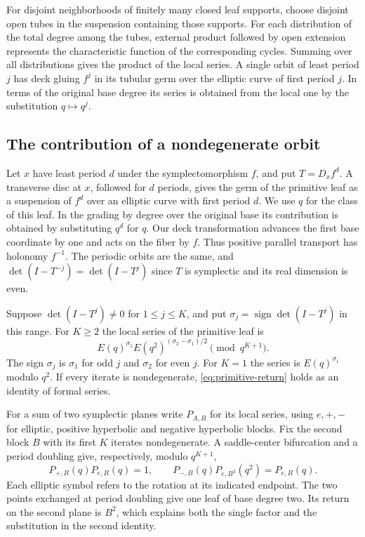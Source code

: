 For disjoint neighborhoods of finitely many closed leaf supports, choose
disjoint open tubes in the suspension containing those supports.
For each distribution of the total degree among the tubes, external
product followed by open extension represents the characteristic function
of the corresponding cycles. Summing over all distributions gives the
product of the local series. A single orbit of least period $j$ has
deck gluing $f^j$ in its tubular germ over the elliptic curve of first
period $j$. In terms of the original base degree its series is obtained
from the local one by the substitution $q\mapsto q^j$.

\subsection{The contribution of a nondegenerate orbit}\label{sec:returns}

Let $x$ have least period $d$ under the symplectomorphism $f$, and put
$T=D_xf^d$. A transverse disc at $x$, followed for $d$ periods,
gives the germ of the primitive leaf as a suspension of $f^d$ over an
elliptic curve with first period $d$. We use $q$ for the class of this
leaf. In the grading by degree over the original base its contribution
is obtained by substituting $q^d$ for $q$. Our deck transformation
advances the first base coordinate by one and acts on the fiber by
$f$. Thus positive parallel transport has holonomy $f^{-1}$.
The periodic orbits are the same, and
$\det(I-T^{-j})=\det(I-T^j)$ since $T$ is symplectic and its real
dimension is even.

\begin{proposition}\label{prop:return}
Suppose $\det(I-T^j)\ne0$ for $1\le j\le K$, and put
$\sigma_j=\operatorname{sign}\det(I-T^j)$ in this range. For $K\ge2$
the local series of the primitive leaf is
\begin{equation}\label{eq:primitive-return}
 E(q)^{\sigma_1} E(q^2)^{(\sigma_2-\sigma_1)/2}
 \pmod {q^{K+1}} .
\end{equation}
The sign $\sigma_j$ is $\sigma_1$ for odd $j$ and $\sigma_2$ for
even $j$. For $K=1$ the series is $E(q)^{\sigma_1}$ modulo $q^2$.
If every iterate is nondegenerate, \eqref{eq:primitive-return} holds
as an identity of formal series.
\end{proposition}

For a sum of two symplectic planes write $P_{A,B}$ for its local
series, using $e,+,-$ for elliptic, positive hyperbolic and negative
hyperbolic blocks. Fix the second block $B$ with its first $K$ iterates
nondegenerate. A saddle-center bifurcation and a period doubling give,
respectively, modulo $q^{K+1}$,
\begin{equation}\label{eq:return-walls}
 P_{+,B}(q)P_{e,B}(q)=1,\qquad
 P_{-,B}(q)P_{e,B^2}(q^2)=P_{e,B}(q).
\end{equation}
Each elliptic symbol refers to the rotation at its indicated endpoint.
The two points exchanged at period doubling give one leaf of base degree
two. Its return on the second plane is $B^2$, which explains both the
single factor and the substitution in the second identity.

